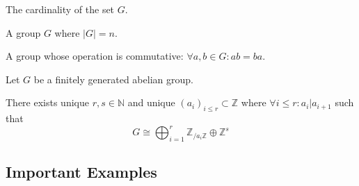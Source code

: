 \begin{definition}
   The cardinality of the set \(G\).
\end{definition}

\begin{definition}
   A group \(G\) where \(|G| = n\).
\end{definition}

\begin{definition}\label{def:abel_group}
   A group whose operation is commutative: \(\forall a, b \in G: ab = ba\).
\end{definition}

\begin{theorem}
   Let \(G\) be a finitely generated abelian group.

   There exists unique \(r, s \in \mathbb{N}\) and unique \((a_i)_{i \leq r} \subset \mathbb{Z}\) where \(\forall i \leq r: a_i | a_{i+1}\) such that
   \[G \cong \bigoplus_{i = 1}^r \mathbb{Z}_{/a_i\mathbb{Z}} \oplus \mathbb{Z}^s\]
\end{theorem}

\subsection{Important Examples}
